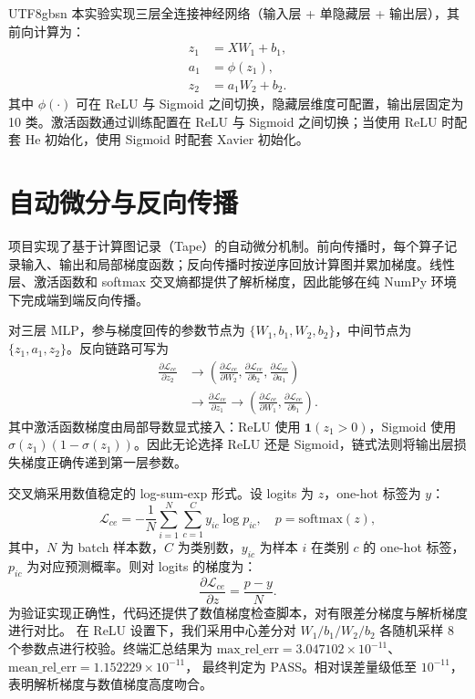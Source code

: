 \documentclass[11pt]{article}
\begin{document}
\begin{CJK*}{UTF8}{gbsn}
本实验实现三层全连接神经网络（输入层 + 单隐藏层 + 输出层），其前向计算为：
\begin{align*}
z_1 &= XW_1 + b_1, \\
a_1 &= \phi(z_1), \\
z_2 &= a_1W_2 + b_2 .
\end{align*}
其中 $\phi(\cdot)$ 可在 ReLU 与 Sigmoid 之间切换，隐藏层维度可配置，输出层固定为 10 类。激活函数通过训练配置在 ReLU 与 Sigmoid 之间切换；当使用 ReLU 时配套 He 初始化，使用 Sigmoid 时配套 Xavier 初始化。

\section{自动微分与反向传播}
项目实现了基于计算图记录（Tape）的自动微分机制。前向传播时，每个算子记录输入、输出和局部梯度函数；反向传播时按逆序回放计算图并累加梯度。线性层、激活函数和 softmax 交叉熵都提供了解析梯度，因此能够在纯 NumPy 环境下完成端到端反向传播。

对三层 MLP，参与梯度回传的参数节点为 $\{W_1,b_1,W_2,b_2\}$，中间节点为 $\{z_1,a_1,z_2\}$。反向链路可写为
\[
\begin{aligned}
\frac{\partial \mathcal{L}_{ce}}{\partial z_2}
&\rightarrow
\left(
\frac{\partial \mathcal{L}_{ce}}{\partial W_2},
\frac{\partial \mathcal{L}_{ce}}{\partial b_2},
\frac{\partial \mathcal{L}_{ce}}{\partial a_1}
\right)\\
&\rightarrow
\frac{\partial \mathcal{L}_{ce}}{\partial z_1}
\rightarrow
\left(
\frac{\partial \mathcal{L}_{ce}}{\partial W_1},
\frac{\partial \mathcal{L}_{ce}}{\partial b_1}
\right).
\end{aligned}
\]
其中激活函数梯度由局部导数显式接入：ReLU 使用 $\mathbf{1}(z_1>0)$，Sigmoid 使用 $\sigma(z_1)(1-\sigma(z_1))$。因此无论选择 ReLU 还是 Sigmoid，链式法则将输出层损失梯度正确传递到第一层参数。

交叉熵采用数值稳定的 log-sum-exp 形式。设 logits 为 $z$，one-hot 标签为 $y$：
\begin{equation*}
\mathcal{L}_{ce}=-\frac{1}{N}\sum_{i=1}^{N}\sum_{c=1}^{C}y_{ic}\log p_{ic},\quad p=\mathrm{softmax}(z),
\end{equation*}
其中，$N$ 为 batch 样本数，$C$ 为类别数，$y_{ic}$ 为样本 $i$ 在类别 $c$ 的 one-hot 标签，$p_{ic}$ 为对应预测概率。则对 logits 的梯度为：
\begin{equation*}
\frac{\partial \mathcal{L}_{ce}}{\partial z}=\frac{p-y}{N}.
\end{equation*}
为验证实现正确性，代码还提供了数值梯度检查脚本，对有限差分梯度与解析梯度进行对比。
在 ReLU 设置下，我们采用中心差分对 $W_1/b_1/W_2/b_2$ 各随机采样 8 个参数点进行校验。终端汇总结果为
$\mathrm{max\_rel\_err}=3.047102\times10^{-11}$、
$\mathrm{mean\_rel\_err}=1.152229\times10^{-11}$，
最终判定为 PASS。相对误差量级低至 $10^{-11}$，表明解析梯度与数值梯度高度吻合。


\end{CJK*}
\end{document}
